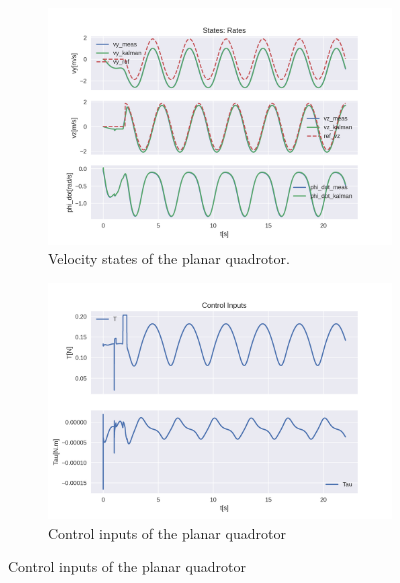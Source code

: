 \documentclass{thesisreport}
\begin{document}
\begin{figure}[H]
\medskip
	\begin{subfigure}{0.48\textwidth}
		\includegraphics[width=\linewidth]{Images/acados_simulations/circular_trajectory/planar_quadrotor/noisy/rateStates.png}
		\caption{Velocity states of the planar quadrotor.} \label{fig:planar_sim_velocities_noisy}
	\end{subfigure}\hspace*{\fill}
	\begin{subfigure}{0.48\textwidth}
		\includegraphics[width=\linewidth]{Images/acados_simulations/circular_trajectory/planar_quadrotor/noisy/controlInputs.png}
		\caption{Control inputs of the planar quadrotor} \label{fig:planar_sim_control_inputs_noisy}
	\end{subfigure}


\end{figure}
\end{document}
